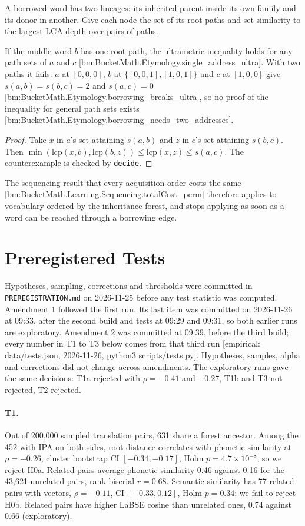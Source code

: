 \documentclass[11pt]{article}
\newcommand{\emp}[1]{{\small[empirical: #1]}}
\newcommand{\bm}[1]{{\small[bm:#1]}}
\newcommand{\testrun}{data/tests.json, 2026-11-26, python3 scripts/tests.py}
\begin{document}
A borrowed word has two lineages: its inherited parent inside its own
family and its donor in another. Give each node the set of its root paths
and set similarity to the largest LCA depth over pairs of paths.

\begin{theorem}
\label{thm:borrow}
If the middle word $b$ has one root path, the ultrametric inequality holds
for any path sets of $a$ and $c$
\bm{BucketMath.Etymology.single\_address\_ultra}. With two paths it fails:
$a$ at $[0,0,0]$, $b$ at $\{[0,0,1],[1,0,1]\}$ and $c$ at $[1,0,0]$ give
$s(a,b)=s(b,c)=2$ and $s(a,c)=0$
\bm{BucketMath.Etymology.borrowing\_breaks\_ultra}, so no proof of the
inequality for general path sets exists
\bm{BucketMath.Etymology.borrowing\_needs\_two\_addresses}.
\end{theorem}

\begin{proof}
Take $x$ in $a$'s set attaining $s(a,b)$ and $z$ in $c$'s set attaining
$s(b,c)$. Then $\min(\mathrm{lcp}(x,b),\mathrm{lcp}(b,z)) \le
\mathrm{lcp}(x,z) \le s(a,c)$. The counterexample is checked by
\texttt{decide}.
\end{proof}

The sequencing result that every acquisition order costs the same
\bm{BucketMath.Learning.Sequencing.totalCost\_perm} therefore applies to
vocabulary ordered by the inheritance forest, and stops applying as soon
as a word can be reached through a borrowing edge.

\section{Preregistered Tests}
\label{sec:tests}

Hypotheses, sampling, corrections and thresholds were committed in
\texttt{PREREGISTRATION.md} on 2026-11-25 before any test statistic was
computed. Amendment 1 followed the first run. Its last item was committed
on 2026-11-26 at 09:33, after the second build and tests at 09:29 and
09:31, so both earlier runs are exploratory. Amendment 2 was committed at
09:39, before the third build; every number in T1 to T3 below comes from
that third run \emp{\testrun}. Hypotheses, samples, alpha and corrections
did not change across amendments. The exploratory runs gave the same
decisions: T1a rejected with $\rho=-0.41$ and $-0.27$, T1b and T3 not
rejected, T2 rejected.

\paragraph{T1.} Out of 200,000 sampled translation pairs, 631 share a
forest ancestor. Among the 452 with IPA on both sides, root distance
correlates with phonetic similarity at $\rho=-0.26$, cluster bootstrap
CI $[-0.34,-0.17]$, Holm $p=4.7\times10^{-8}$, so we reject H0a. Related
pairs average phonetic similarity 0.46 against 0.16 for the 43,621
unrelated pairs, rank-biserial $r=0.68$. Semantic similarity has 77
related pairs with vectors, $\rho=-0.11$, CI $[-0.33,0.12]$, Holm
$p=0.34$: we fail to reject H0b. Related pairs have higher LaBSE cosine
than unrelated ones, 0.74 against 0.66 (exploratory).
\end{document}
